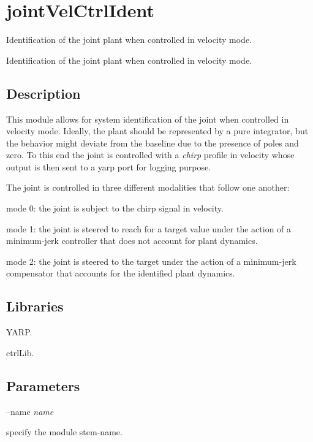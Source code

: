 \section{joint\+Vel\+Ctrl\+Ident}
\label{group__icub__jointVelCtrlIdent}


Identification of the joint plant when controlled in velocity mode.  


Identification of the joint plant when controlled in velocity mode. 

\hypertarget{group__icub__tld_intro_sec}{}\subsection{Description}\label{group__icub__tld_intro_sec}
This module allows for system identification of the joint when controlled in velocity mode. Ideally, the plant should be represented by a pure integrator, but the behavior might deviate from the baseline due to the presence of poles and zero. To this end the joint is controlled with a {\itshape chirp} profile in velocity whose output is then sent to a yarp port for logging purpose.

The joint is controlled in three different modalities that follow one another\+:
\begin{DoxyItemize}
\item mode 0\+: the joint is subject to the chirp signal in velocity.
\item mode 1\+: the joint is steered to reach for a target value under the action of a minimum-\/jerk controller that does not account for plant dynamics.
\item mode 2\+: the joint is steered to the target under the action of a minimum-\/jerk compensator that accounts for the identified plant dynamics.
\end{DoxyItemize}\hypertarget{group__icub__tld_lib_sec}{}\subsection{Libraries}\label{group__icub__tld_lib_sec}

\begin{DoxyItemize}
\item Y\+A\+R\+P.
\item ctrl\+Lib.
\end{DoxyItemize}\hypertarget{group__icub__tld_parameters_sec}{}\subsection{Parameters}\label{group__icub__tld_parameters_sec}
--name {\itshape name} 
\begin{DoxyItemize}
\item specify the module stem-\/name.
\end{DoxyItemize}

